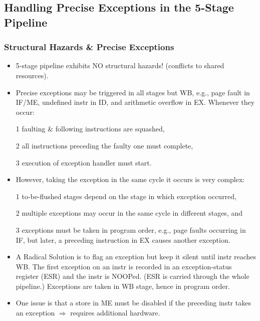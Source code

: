 \documentclass{beamer}
\renewcommand{\emph}[1]{\textcolor{structure}{#1}}
\newcommand{\emp}[1]{\textcolor{DikuRed}{ #1}}
\begin{document}
\subsection{Handling Precise Exceptions in the 5-Stage Pipeline}

\begin{frame}[fragile,t]
\frametitle{Structural Hazards \& Precise Exceptions}

\begin{scriptsize}
\begin{itemize}
\item 5-stage pipeline exhibits \emph{NO structural hazards!} 
        (conflicts to shared resources).\bigskip

\item \emp{Precise exceptions} may be triggered in all stages but WB,
        e.g., page fault in IF/ME, undefined instr in ID, and
              arithmetic overflow in EX. Whenever they occur:
\item[1] faulting \& following instructions are squashed,
\item[2] all instructions preceding the faulty one must complete,
\item[3] execution of exception handler must start.\bigskip

\item \emp{However, taking the exception in the same cycle it occurs is very complex:}
\item[1] to-be-flushed stages depend on the stage in which exception occurred,
\item[2] multiple exceptions may occur in the same cycle in different stages, and
\item[3] exceptions must be taken in program order,
            e.g., page faults occurring in IF, but later, a 
            preceding instruction in EX causes another
            exception.\bigskip
 
\item \emp{A Radical Solution is to flag an exception but keep
            it silent until instr reaches WB}.
            The first exception on an instr is recorded in an
            exception-status register (ESR) and the instr is NOOPed. 
            (ESR is carried through the whole pipeline.)
            Exceptions are taken in WB stage, hence in program order.
\item \alert{One issue is that a store in ME must be disabled
                if the preceding instr takes an exception} 
                $\Rightarrow$ requires additional hardware.   
 

\end{itemize}
\end{scriptsize}
\end{frame}
\end{document}
